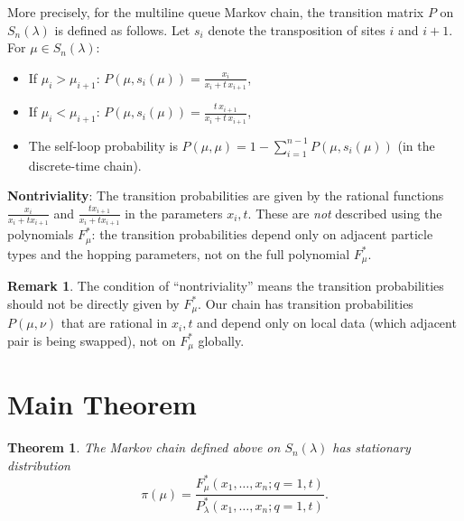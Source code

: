 \documentclass[12pt]{article}
\newtheorem{theorem}{Theorem}
\theoremstyle{definition}
\newtheorem{remark}{Remark}
\begin{document}
More precisely, for the multiline queue Markov chain, the transition matrix $P$ on $S_n(\lambda)$ is defined as follows. Let $s_i$ denote the transposition of sites $i$ and $i+1$. For $\mu \in S_n(\lambda)$:
\begin{itemize}
\item If $\mu_i > \mu_{i+1}$: $P(\mu, s_i(\mu)) = \frac{x_i}{x_i + t\,x_{i+1}}$,
\item If $\mu_i < \mu_{i+1}$: $P(\mu, s_i(\mu)) = \frac{t\,x_{i+1}}{x_i + t\,x_{i+1}}$,
\item The self-loop probability is $P(\mu,\mu) = 1 - \sum_{i=1}^{n-1} P(\mu, s_i(\mu))$ (in the discrete-time chain).
\end{itemize}

\textbf{Nontriviality}: The transition probabilities are given by the rational functions $\frac{x_i}{x_i + t x_{i+1}}$ and $\frac{t x_{i+1}}{x_i + t x_{i+1}}$ in the parameters $x_i, t$. These are \emph{not} described using the polynomials $F^*_\mu$: the transition probabilities depend only on adjacent particle types and the hopping parameters, not on the full polynomial $F^*_\mu$.

\begin{remark}
The condition of ``nontriviality'' means the transition probabilities should not be directly given by $F^*_\mu$. Our chain has transition probabilities $P(\mu,\nu)$ that are rational in $x_i, t$ and depend only on local data (which adjacent pair is being swapped), not on $F^*_\mu$ globally.
\end{remark}

\section{Main Theorem}

\begin{theorem}\label{thm:main}
The Markov chain defined above on $S_n(\lambda)$ has stationary distribution
$$\pi(\mu) = \frac{F^*_\mu(x_1,\ldots,x_n; q=1, t)}{P^*_\lambda(x_1,\ldots,x_n; q=1, t)}.$$
\end{theorem}
\end{document}
